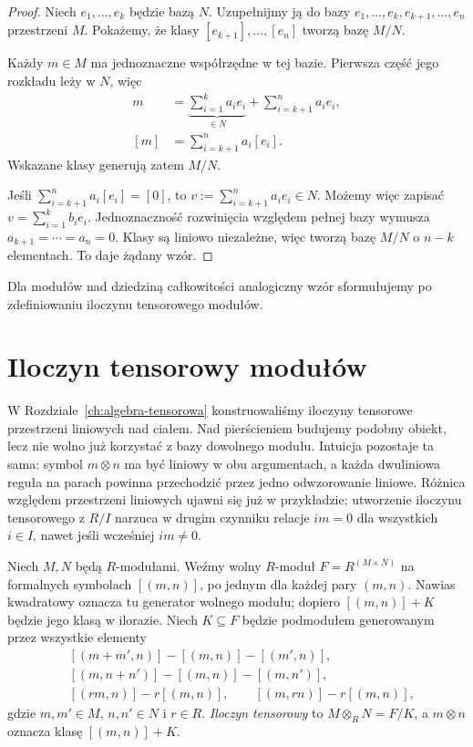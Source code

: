 \begin{proof}
Niech $e_1,\ldots,e_k$ będzie bazą $N$.
Uzupełnijmy ją do bazy $e_1,\ldots,e_k,e_{k+1},\ldots,e_n$
przestrzeni $M$. Pokażemy, że klasy
$[e_{k+1}],\ldots,[e_n]$ tworzą bazę $M/N$.

Każdy $m\in M$ ma jednoznaczne współrzędne w tej bazie.
Pierwsza część jego rozkładu leży w $N$, więc
\[
\begin{aligned}
m&=\underbrace{\sum_{i=1}^k a_i e_i}_{\in N}
   +\sum_{i=k+1}^n a_i e_i,\\
[m]&=\sum_{i=k+1}^n a_i[e_i].
\end{aligned}
\]
Wskazane klasy generują zatem $M/N$.

Jeśli $\sum_{i=k+1}^n a_i[e_i]=[0]$, to
$v:=\sum_{i=k+1}^n a_i e_i\in N$.
Możemy więc zapisać $v=\sum_{i=1}^k b_i e_i$.
Jednoznaczność rozwinięcia względem pełnej bazy
wymusza $a_{k+1}=\cdots=a_n=0$.
Klasy są liniowo niezależne, więc tworzą bazę
$M/N$ o $n-k$ elementach. To daje żądany wzór.
\end{proof}

Dla modułów nad dziedziną całkowitości analogiczny wzór
sformułujemy po zdefiniowaniu iloczynu tensorowego modułów.

\section{Iloczyn tensorowy modułów}
\label{sec:tensor-modulow-algebra}

W Rozdziale~\ref{ch:algebra-tensorowa} konstruowaliśmy iloczyny tensorowe
przestrzeni liniowych nad ciałem. Nad pierścieniem
budujemy podobny obiekt, lecz nie wolno już korzystać
z bazy dowolnego modułu. Intuicja pozostaje ta sama:
symbol $m\otimes n$ ma być liniowy w obu argumentach,
a każda dwuliniowa reguła na parach powinna przechodzić
przez jedno odwzorowanie liniowe.
Różnica względem przestrzeni liniowych ujawni się już w przykładzie:
utworzenie iloczynu tensorowego z $R/I$ narzuca w drugim czynniku relacje $im=0$
dla wszystkich $i\in I$, nawet jeśli wcześniej $im\ne0$.

\begin{definicja}
\label{def:tensor-modulow}
Niech $M,N$ będą $R$-modułami. Weźmy wolny
$R$-moduł $F=R^{(M\times N)}$ na formalnych
symbolach $[(m,n)]$, po jednym dla każdej pary $(m,n)$.
Nawias kwadratowy oznacza tu generator wolnego modułu;
dopiero $[(m,n)]+K$ będzie jego klasą w ilorazie.
Niech $K\subseteq F$ będzie
podmodułem generowanym przez wszystkie elementy
\[
\begin{aligned}
 &[(m+m',n)]-[(m,n)]-[(m',n)],\\
 &[(m,n+n')]-[(m,n)]-[(m,n')],\\
 &[(rm,n)]-r[(m,n)],\qquad [(m,rn)]-r[(m,n)],
\end{aligned}
\]
gdzie $m,m'\in M$, $n,n'\in N$ i $r\in R$.
\emph{Iloczyn tensorowy} to $M\otimes_R N=F/K$,
a $m\otimes n$ oznacza klasę $[(m,n)]+K$.
\end{definicja}

